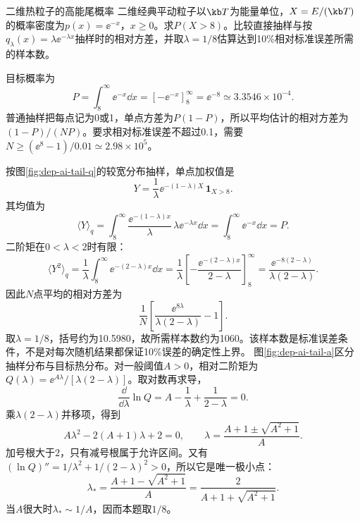 \begin{example}二维热粒子的高能尾概率
二维经典平动粒子以$\kb T$为能量单位，$X=E/(\kb T)$的概率密度为$p(x)=\ee^{-x}$，$x\geq0$。求$P(X>8)$。比较直接抽样与按$q_\lambda(x)=\lambda\ee^{-\lambda x}$抽样时的相对方差，并取$\lambda=1/8$估算达到10\%相对标准误差所需的样本数。
\end{example}
\begin{solution}
目标概率为
\[P=\int_8^\infty\ee^{-x}\dd x
=[-\ee^{-x}]_8^\infty=\ee^{-8}\simeq3.3546\times10^{-4}.\]
普通抽样把每点记为0或1，单点方差为$P(1-P)$，所以平均估计的相对方差为$(1-P)/(NP)$。要求相对标准误差不超过0.1，需要$N\geq(\ee^8-1)/0.01\simeq2.98\times10^5$。

按图\ref{fig:dep-ai-tail-q}的较宽分布抽样，单点加权值是
\[
 Y=\frac1\lambda\ee^{-(1-\lambda)X}\,\boldsymbol1_{X>8}.
\]
其均值为
\[\langle Y\rangle_q=\int_8^\infty
\frac{\ee^{-(1-\lambda)x}}\lambda\,
\lambda\ee^{-\lambda x}\dd x
=\int_8^\infty\ee^{-x}\dd x=P.\]
二阶矩在$0<\lambda<2$时有限：
\[
 \langle Y^2\rangle_q=\frac1\lambda\int_8^\infty
 \ee^{-(2-\lambda)x}\dd x
 =\frac1\lambda\left[-\frac{\ee^{-(2-\lambda)x}}{2-\lambda}\right]_8^\infty
 =\frac{\ee^{-8(2-\lambda)}}{\lambda(2-\lambda)}.
\]
因此$N$点平均的相对方差为
\[
 \frac1N\left[\frac{\ee^{8\lambda}}{\lambda(2-\lambda)}-1\right].
\]
取$\lambda=1/8$，括号约为10.5980，故所需样本数约为1060。该样本数是标准误差条件，不是对每次随机结果都保证10\%误差的确定性上界。
图\ref{fig:dep-ai-tail-a}区分抽样分布与目标热分布。对一般阈值$A>0$，相对二阶矩为$Q(\lambda)=\ee^{A\lambda}/[\lambda(2-\lambda)]$。取对数再求导，
\[\frac{\dd}{\dd\lambda}\ln Q
=A-\frac1\lambda+\frac1{2-\lambda}=0.\]
乘$\lambda(2-\lambda)$并移项，得到
\[A\lambda^2-2(A+1)\lambda+2=0,\qquad
\lambda=\frac{A+1\pm\sqrt{A^2+1}}{A}.\]
加号根大于$2$，只有减号根属于允许区间。又有
$(\ln Q)''=1/\lambda^2+1/(2-\lambda)^2>0$，所以它是唯一极小点：
\[\lambda_* =\frac{A+1-\sqrt{A^2+1}}{A}
=\frac2{A+1+\sqrt{A^2+1}}.\]
当$A$很大时$\lambda_*\sim1/A$，因而本题取$1/8$。
\end{solution}

